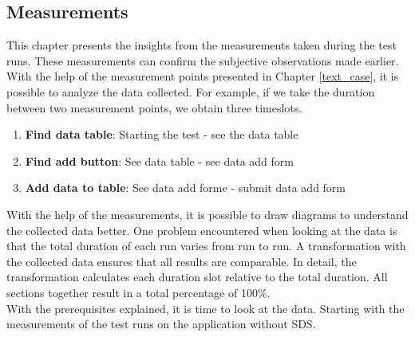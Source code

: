 \subsection{Measurements}
This chapter presents the insights from the measurements taken during the test runs. These measurements can confirm the subjective observations made earlier. With the help of the measurement points presented in Chapter \ref{text_case}, it is possible to analyze the data collected. For example, if we take the duration between two measurement points, we obtain three timeslots. 
\begin{enumerate}
    \item \textbf{Find data table}: Starting the test - see the data table
    \item \textbf{Find add button}: See data table - see data add form
    \item \textbf{Add data to table}: See data add forme - submit data add form
\end{enumerate}
With the help of the measurements, it is possible to draw diagrams to understand the collected data better. One problem encountered when looking at the data is that the total duration of each run varies from run to run. A transformation with the collected data ensures that all results are comparable. In detail, the transformation calculates each duration slot relative to the total duration. All sections together result in a total percentage of 100\%. \\

With the prerequisites explained, it is time to look at the data. Starting with the measurements of the test runs on the application without \ac{SDS}.\\

